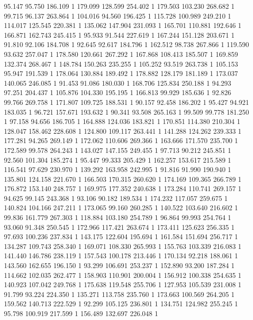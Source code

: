 	95.147	95.750	186.109	1
	179.099	128.599	254.402	1
	179.503	103.230	268.682	1
	99.715	96.137	263.864	1
	104.016	94.560	196.425	1
	115.728	100.989	249.210	1
	114.017	125.545	220.381	1
	135.062	147.904	231.093	1
	165.701	110.881	192.646	1
	166.871	162.743	245.415	1
	95.933	91.544	227.619	1
	167.244	151.128	203.671	1
	91.810	92.106	184.708	1
	92.645	92.617	184.796	1
	162.512	98.738	267.866	1
	119.590	93.632	257.047	1
	178.580	120.661	267.292	1
	167.868	108.413	185.507	1
	169.859	132.374	268.467	1
	148.784	150.263	235.255	1
	105.252	93.519	263.738	1
	105.153	95.947	191.539	1
	178.064	130.884	189.492	1
	178.882	128.179	181.189	1
	173.037	140.065	246.085	1
	91.453	91.086	180.030	1
	168.706	125.834	250.188	1
	94.293	97.251	204.437	1
	105.876	104.330	195.195	1
	166.813	99.929	185.636	1
	92.826	99.766	269.758	1
	171.807	109.725	188.531	1
	90.157	92.458	186.202	1
	95.427	94.921	183.035	1
	96.721	157.671	193.632	1
	90.341	93.508	265.163	1
	99.509	99.778	181.250	1
	97.158	94.656	186.705	1
	164.888	124.036	183.821	1
	170.851	114.380	210.304	1
	128.047	158.462	228.608	1
	124.800	109.117	263.441	1
	141.288	124.262	239.333	1
	177.281	94.265	269.149	1
	172.062	110.606	269.366	1
	163.666	171.570	235.700	1
	172.589	99.578	264.243	1
	143.027	147.155	249.455	1
	97.713	90.212	245.851	1
	92.560	101.304	185.274	1
	95.447	99.333	205.429	1
	162.257	153.617	215.589	1
	116.541	97.629	230.970	1
	139.292	163.958	242.995	1
	91.816	91.990	190.940	1
	135.801	124.158	221.670	1
	166.503	170.315	260.620	1
	174.169	109.365	266.789	1
	176.872	153.140	248.757	1
	169.975	177.352	240.638	1
	173.284	110.741	269.157	1
	94.625	99.145	243.368	1
	93.106	90.182	189.534	1
	174.232	117.057	259.675	1
	140.824	104.166	247.211	1
	173.065	99.160	260.285	1
	140.522	103.640	216.602	1
	99.836	161.779	267.303	1
	118.884	103.180	254.789	1
	96.864	99.993	254.764	1
	93.060	91.348	250.545	1
	172.966	117.421	263.674	1
	173.411	125.623	256.335	1
	97.693	100.236	237.834	1
	143.175	122.604	195.694	1
	161.584	151.694	256.717	1
	134.287	109.743	258.340	1
	169.071	108.330	265.993	1
	155.763	103.339	216.083	1
	141.440	146.786	238.119	1
	157.543	100.178	213.446	1
	170.134	92.218	188.061	1
	143.560	162.655	196.150	1
	93.299	106.691	253.237	1
	152.890	93.200	187.284	1
	114.662	102.035	262.477	1
	158.903	110.901	200.004	1
	156.912	100.338	254.635	1
	140.923	107.042	249.768	1
	175.638	119.548	255.706	1
	127.953	105.539	231.008	1
	91.799	93.224	224.350	1
	135.271	113.758	235.760	1
	173.663	100.569	264.205	1
	159.562	140.713	222.529	1
	92.299	105.125	236.801	1
	134.751	124.982	255.245	1
	95.798	100.919	217.599	1
	156.489	132.697	226.048	1
